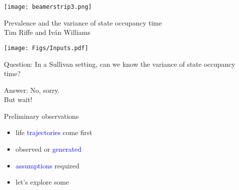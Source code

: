 \documentclass[20pt,usenames,dvipsnames]{beamer}
\begin{document}

\begin{frame}[plain]
	\vspace{-3cm}
 \centerline{\texttt{[image: beamerstrip3.png]}}

	
	\huge
	\vspace{1em}
	
	Prevalence and the variance of state occupancy time\\
	\vspace{1em}
	\large 
	Tim Riffe and Iv\'{a}n Williams 
\end{frame}
\begin{frame}[plain]
 \Huge
 \begin{center}
   \texttt{[image: Figs/Inputs.pdf]}
 \end{center}
\end{frame}
\begin{frame}[plain]
\Huge
\begin{center}
Question: \pause In a Sullivan setting, can we know the variance of state occupancy time?
\end{center}
\end{frame}
\begin{frame}[plain]
\Huge
\begin{center}
Answer: \pause No, sorry. \pause \\ But wait!
\end{center}
\end{frame}

\begin{frame}[plain]
\Huge
\begin{center}
Preliminary observations \\
\Large \pause
\begin{itemize}[<+->]
\item life \textcolor{blue}{trajectories} come first
\item observed or \textcolor{blue}{generated}
\item \textcolor{blue}{assumptions} required
\item let's explore some
\end{itemize}
\end{center}
\end{frame}
\end{document}

